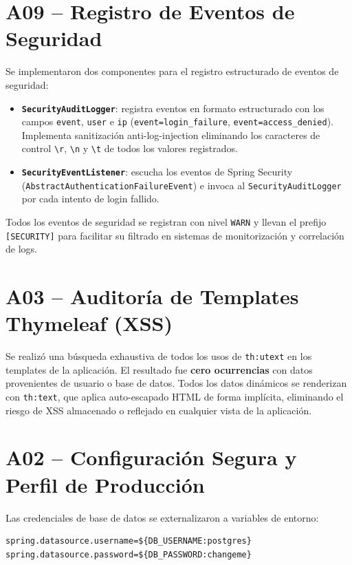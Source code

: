 \documentclass[12pt, a4paper]{report}
\begin{document}
\section{A09 -- Registro de Eventos de Seguridad}

Se implementaron dos componentes para el registro estructurado de eventos de seguridad:

\begin{itemize}
  \item \textbf{\texttt{SecurityAuditLogger}}: registra eventos en formato estructurado con los campos \texttt{event}, \texttt{user} e \texttt{ip} (\texttt{event=login\_failure}, \texttt{event=access\_denied}). Implementa sanitización anti-log-injection eliminando los caracteres de control \texttt{\textbackslash r}, \texttt{\textbackslash n} y \texttt{\textbackslash t} de todos los valores registrados.
  \item \textbf{\texttt{SecurityEventListener}}: escucha los eventos de Spring Security (\texttt{AbstractAuthenticationFailureEvent}) e invoca al \texttt{SecurityAuditLogger} por cada intento de login fallido.
\end{itemize}

Todos los eventos de seguridad se registran con nivel \texttt{WARN} y llevan el prefijo \texttt{[SECURITY]} para facilitar su filtrado en sistemas de monitorización y correlación de logs.

\section{A03 -- Auditoría de Templates Thymeleaf (XSS)}

Se realizó una búsqueda exhaustiva de todos los usos de \texttt{th:utext} en los templates de la aplicación. El resultado fue \textbf{cero ocurrencias} con datos provenientes de usuario o base de datos. Todos los datos dinámicos se renderizan con \texttt{th:text}, que aplica auto-escapado HTML de forma implícita, eliminando el riesgo de XSS almacenado o reflejado en cualquier vista de la aplicación.

\section{A02 -- Configuración Segura y Perfil de Producción}

Las credenciales de base de datos se externalizaron a variables de entorno:

\begin{lstlisting}
spring.datasource.username=${DB_USERNAME:postgres}
spring.datasource.password=${DB_PASSWORD:changeme}
\end{lstlisting}
\end{document}
